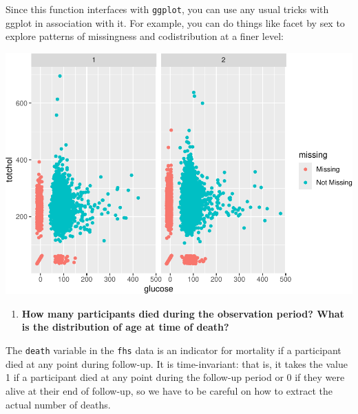 \documentclass[
]{book}
\newenvironment{Shaded}{\begin{snugshade}}{\end{snugshade}}
\newcommand{\DataTypeTok}[1]{\textcolor[rgb]{0.13,0.29,0.53}{#1}}
\newcommand{\KeywordTok}[1]{\textcolor[rgb]{0.13,0.29,0.53}{\textbf{#1}}}
\newcommand{\NormalTok}[1]{#1}
\newcommand{\OperatorTok}[1]{\textcolor[rgb]{0.81,0.36,0.00}{\textbf{#1}}}
\newcommand{\StringTok}[1]{\textcolor[rgb]{0.31,0.60,0.02}{#1}}
\providecommand{\tightlist}{%
  \setlength{\itemsep}{0pt}\setlength{\parskip}{0pt}}
\begin{document}
Since this function interfaces with \texttt{ggplot}, you can use any usual tricks with ggplot in association with it. For example, you can do things like facet by sex to explore patterns of missingness and codistribution at a finer level:

\begin{Shaded}
\end{Shaded}

\includegraphics{adv_epi_analysis_files/figure-latex/unnamed-chunk-178-1.pdf}

\begin{enumerate}
\def\labelenumi{\arabic{enumi}.}
\setcounter{enumi}{2}
\tightlist
\item
  \textbf{How many participants died during the observation period? What is the distribution of age at time of death?}
\end{enumerate}

The \texttt{death} variable in the \texttt{fhs} data is an indicator for mortality if a participant died at any point during follow-up. It is time-invariant: that is, it takes the value 1 if a participant died at any point during the follow-up period or 0 if they were alive at their end of follow-up, so we have to be careful on how to extract the actual number of deaths.
\end{document}
